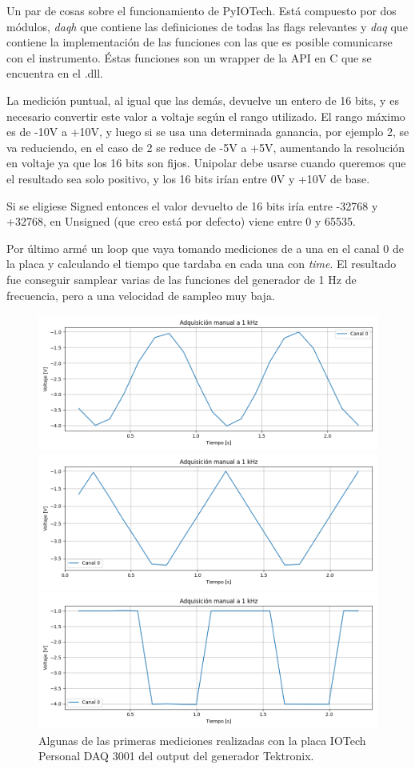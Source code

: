 Un par de cosas sobre el funcionamiento de PyIOTech. Está compuesto por dos módulos, \textit{daqh} que contiene las definiciones de todas las flags relevantes y \textit{daq} que contiene la implementación de las funciones con las que es posible comunicarse con el instrumento. Éstas funciones son un wrapper de la API en C que se encuentra en el .dll.

La medición puntual, al igual que las demás, devuelve un entero de 16 bits, y es necesario convertir este valor a voltaje según el rango utilizado. El rango máximo es de -10V a +10V, y luego si se usa una determinada ganancia, por ejemplo 2, se va reduciendo, en el caso de 2 se reduce de -5V a +5V, aumentando la resolución en voltaje ya que los 16 bits son fijos. Unipolar debe usarse cuando queremos que el resultado sea solo positivo, y los 16 bits irían entre 0V y +10V de base.

Si se eligiese Signed entonces el valor devuelto de 16 bits iría entre -32768 y +32768, en Unsigned (que creo está por defecto) viene entre 0 y 65535.

Por último armé un loop que vaya tomando mediciones de a una en el canal 0 de la placa y calculando el tiempo que tardaba en cada una con \textit{time}. El resultado fue conseguir samplear varias de las funciones del generador de 1 Hz de frecuencia, pero a una velocidad de sampleo muy baja. 

\begin{figure}[th!]
	\centering
	\includegraphics[width=0.5678\linewidth]{Figures/02_06_2025/Ploteo_placa_pyIOTech.png}
	
	\includegraphics[width=0.5678\linewidth]{Figures/02_06_2025/Ploteo_rampa.png}
	
	\includegraphics[width=0.5678\linewidth]{Figures/02_06_2025/Ploteo_cuadrada.png}
	\caption{Algunas de las primeras mediciones realizadas con la placa IOTech Personal DAQ 3001 del output del generador Tektronix.}
	\label{fig:ploteoplacapyiotech}
\end{figure}

